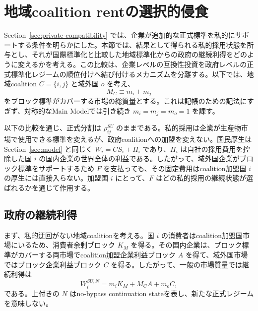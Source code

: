 \section{地域coalition rentの選択的侵食}
\label{sec:selective-erosion}

Section~\ref{sec:private-compatibility} では、企業が追加的な正式標準を私的にサポートする条件を明らかにした。本節では、結果として得られる私的採用状態を所与とし、それが国際標準化と比較した地域標準化からの政府の継続利得をどのように変えるかを考える。この比較は、企業レベルの互換性投資を政府レベルの正式標準化レジームの順位付けへ結び付けるメカニズムを分離する。以下では、地域coalition $C=\{i,j\}$ と域外国 $o$ を考え、
\begin{equation}
    M_C\equiv m_i+m_j
    \label{eq:coalition-market-mass}
\end{equation}
をブロック標準がカバーする市場の総質量とする。これは記帳のための記法にすぎず、対称的なMain Modelでは引き続き $m_i=m_j=m_o=1$ を課す。

以下の比較を通じ、正式分割は $\rho_{ij}^{SU}$ のままである。私的採用は企業が生産物市場で使用できる標準を変えるが、政府coalitionへの加盟を変えない。国民厚生はSection~\ref{sec:model} と同じく $W_i=CS_i+\Pi_i$ であり、$\Pi_i$ は自社の採用費用を控除した国 $i$ の国内企業の世界全体の利益である。したがって、域外国企業がブロック標準をサポートするため $F$ を支払っても、その固定費用はcoalition加盟国 $i$ の厚生には直接入らない。加盟国 $i$ にとって、$F$ はどの私的採用の継続状態が選ばれるかを通じて作用する。

\subsection{政府の継続利得}
\label{subsec:selective-payoffs}

まず、私的迂回がない地域coalitionを考える。国 $i$ の消費者はcoalition加盟国市場にいるため、消費者余剰ブロック $K_M$ を得る。その国内企業は、ブロック標準がカバーする両市場でcoalition加盟企業利益ブロック $A$ を得て、域外国市場ではブロック企業利益ブロック $C$ を得る。したがって、一般の市場質量では継続利得は
\begin{equation}
    W_i^{SU,N}
    =m_iK_M+M_CA+m_oC,
    \label{eq:welfare-su-member-no-bypass-general}
\end{equation}
である。上付きの $N$ はno-bypass continuation stateを表し、新たな正式レジームを意味しない。

